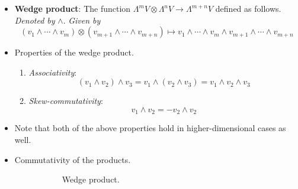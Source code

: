 \documentclass[../notes.tex]{subfiles}
\begin{document}
\begin{itemize}
\begin{itemize}
\begin{itemize}
        \end{itemize}
    \end{itemize}
    \item \textbf{Wedge product}: The function $\Lambda^mV\otimes\Lambda^nV\to\Lambda^{m+n}V$ defined as follows. \emph{Denoted by} $\bm{\wedge}$. \emph{Given by}
    \begin{equation*}
        (v_1\wedge\cdots\wedge v_m)\otimes(v_{m+1}\wedge\cdots\wedge v_{m+n}) \mapsto v_1\wedge\cdots\wedge v_m\wedge v_{m+1}\wedge\cdots\wedge v_{m+n}
    \end{equation*}
    \item Properties of the wedge product.
    \begin{enumerate}
        \item \emph{Associativity}:
        \begin{equation*}
            (v_1\wedge v_2)\wedge v_3 = v_1\wedge(v_2\wedge v_3) = v_1\wedge v_2\wedge v_3
        \end{equation*}
        \item \emph{Skew-commutativity}:
        \begin{equation*}
            v_1\wedge v_2 = -v_2\wedge v_2
        \end{equation*}
    \end{enumerate}
    \item Note that both of the above properties hold in higher-dimensional cases as well.
    \item Commutativity of the products.
    \begin{figure}[h!]
        \centering
        \DisableQuotes
        \begin{subfigure}[b]{0.35\linewidth}
            \centering
            \vspace{-1.5em}
            \caption{Wedge product.}
            \label{fig:CDwedgeSyma}
        \end{subfigure}
        \begin{subfigure}[b]{0.35\linewidth}
            \centering
            \begin{tikzcd}

\end{tikzcd}
\end{subfigure}
\end{figure}
\end{itemize}
\end{document}
